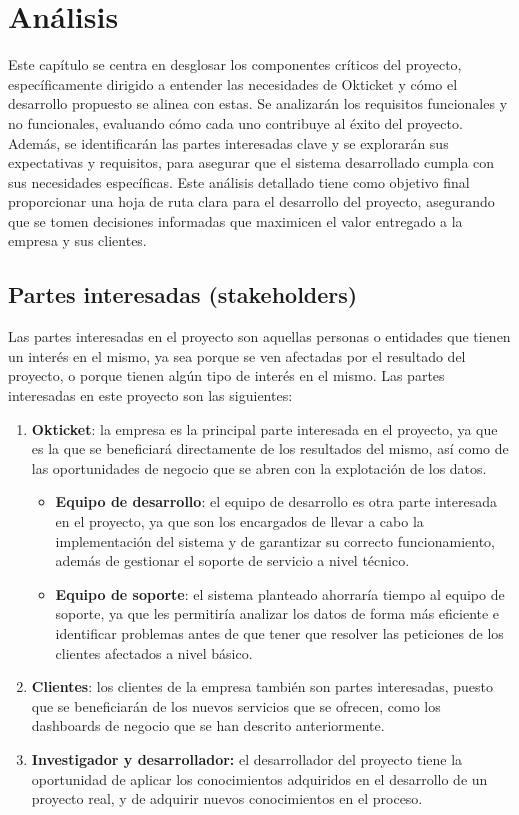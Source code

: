 \chapter{Análisis}\label{chap:analisis}
Este capítulo se centra en desglosar los componentes críticos del proyecto, específicamente
dirigido a entender las necesidades de Okticket y cómo el desarrollo propuesto se alinea con estas.
Se analizarán los requisitos funcionales y no funcionales, evaluando cómo cada uno contribuye al
éxito del proyecto. Además, se identificarán las partes interesadas clave y se explorarán sus
expectativas y requisitos, para asegurar que el sistema desarrollado cumpla con sus necesidades
específicas. Este análisis detallado tiene como objetivo final proporcionar una hoja de ruta
clara para el desarrollo del proyecto, asegurando que se tomen decisiones informadas que maximicen
el valor entregado a la empresa y sus clientes.

\section{Partes interesadas (stakeholders)}\label{sec:stakeholders}
Las partes interesadas en el proyecto son aquellas personas o entidades que tienen un interés
en el mismo, ya sea porque se ven afectadas por el resultado del proyecto, o porque tienen
algún tipo de interés en el mismo. Las partes interesadas en este proyecto son las siguientes:

\begin{enumerate}
	\item \textbf{Okticket}: la empresa es la principal parte interesada en el proyecto, ya que
		es la que se beneficiará directamente de los resultados del mismo, así como de las
		oportunidades de negocio que se abren con la explotación de los datos.
		\begin{itemize}
			\item \textbf{Equipo de desarrollo}: el equipo de desarrollo es otra parte interesada en el
				proyecto, ya que son los encargados de llevar a cabo la implementación del sistema y
				de garantizar su correcto funcionamiento, además de gestionar el soporte de servicio
				a nivel técnico.
			\item \textbf{Equipo de soporte}: el sistema planteado ahorraría tiempo al equipo de
				soporte, ya que les permitiría analizar los datos de forma más eficiente e identificar
				problemas antes de que tener que resolver las peticiones de los clientes afectados a
				nivel básico.
		\end{itemize}
	\item \textbf{Clientes}: los clientes de la empresa también son partes interesadas, puesto
		que se beneficiarán de los nuevos servicios que se ofrecen, como los dashboards de
		negocio que se han descrito anteriormente.
	\item \textbf{Investigador y desarrollador:} el desarrollador del proyecto tiene la oportunidad de
		aplicar los conocimientos adquiridos en el desarrollo de un proyecto real, y de adquirir
		nuevos conocimientos en el proceso.
\end{enumerate}

